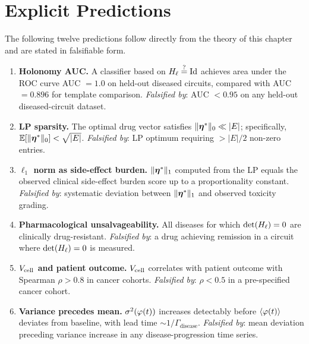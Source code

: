 \section{Explicit Predictions}
\label{sec:therapeutic-predictions}

The following twelve predictions follow directly from the theory of this
chapter and are stated in falsifiable form.

\begin{enumerate}[label=\textbf{P\arabic*.}, leftmargin=3em]

\item \textbf{Holonomy AUC.}
  A classifier based on $H_\ell \stackrel{?}{=} \mathrm{Id}$ achieves
  area under the ROC curve AUC $= 1.0$ on held-out diseased circuits,
  compared with AUC $= 0.896$ for template comparison.
  \emph{Falsified by}: AUC $< 0.95$ on any held-out diseased-circuit dataset.

\item \textbf{LP sparsity.}
  The optimal drug vector satisfies $\|\boldsymbol{\eta}^*\|_0 \ll |E|$;
  specifically, $\mathbb{E}[\|\boldsymbol{\eta}^*\|_0] < \sqrt{|E|}$.
  \emph{Falsified by}: LP optimum requiring $> |E|/2$ non-zero entries.

\item \textbf{$\ell_1$ norm as side-effect burden.}
  $\|\boldsymbol{\eta}^*\|_1$ computed from the LP equals the observed clinical
  side-effect burden score up to a proportionality constant.
  \emph{Falsified by}: systematic deviation between $\|\boldsymbol{\eta}^*\|_1$ and
  observed toxicity grading.

\item \textbf{Pharmacological unsalvageability.}
  All diseases for which $\det(H_\ell) = 0$ are clinically drug-resistant.
  \emph{Falsified by}: a drug achieving remission in a circuit where
  $\det(H_\ell) = 0$ is measured.

\item \textbf{$V_{\mathrm{cell}}$ and patient outcome.}
  $V_{\mathrm{cell}}$ correlates with patient outcome with Spearman $\rho > 0.8$
  in cancer cohorts.
  \emph{Falsified by}: $\rho < 0.5$ in a pre-specified cancer cohort.

\item \textbf{Variance precedes mean.}
  $\sigma^2(\varphi(t))$ increases detectably before
  $\langle\varphi(t)\rangle$ deviates from baseline, with lead
  time $\sim 1/\Gamma_{\mathrm{disease}}$.
  \emph{Falsified by}: mean deviation preceding variance increase in
  any disease-progression time series.


\end{enumerate}
